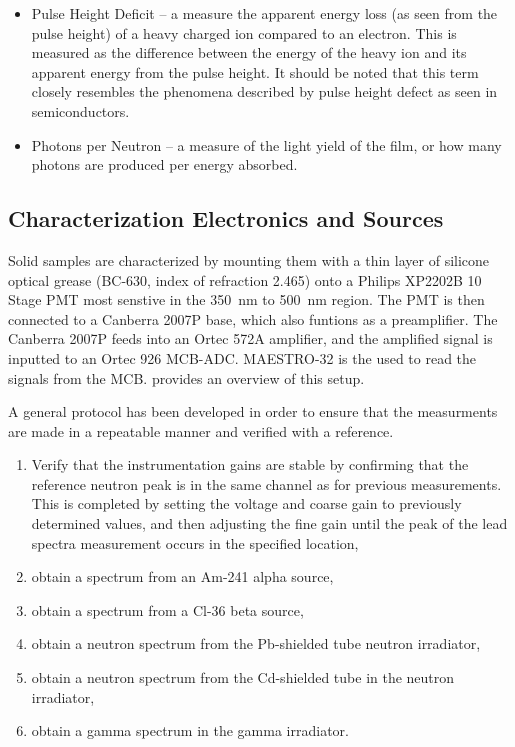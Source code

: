 \begin{itemize}
  \item  Pulse Height Deficit – a measure the apparent energy loss (as seen from the pulse height) of a heavy charged ion compared to an electron. This is measured as the difference between the energy of the heavy ion and its apparent energy from the pulse height. It should be noted that this term closely resembles the phenomena described by pulse height defect as seen in semiconductors.
  \item  Photons per Neutron – a measure of the light yield of the film, or how many photons are produced per energy absorbed.
\end{itemize}

\subsection{Characterization Electronics and Sources}
Solid samples are characterized by mounting them with a thin layer of silicone optical grease (BC-630, index of refraction 2.465) onto a Philips XP2202B 10 Stage PMT most senstive in the \SI{350}{\nm} to \SI{500}{\nm} region.
The PMT is then connected to a Canberra 2007P base, which also funtions as a preamplifier.
The Canberra 2007P feeds into an Ortec 572A amplifier, and the amplified signal is inputted to an Ortec 926 MCB-ADC.
MAESTRO-32 is the used to read the signals from the MCB.
 provides an overview of this setup.
\begin{figure}
  \label{fig:ElectronicSetup}
\end{figure}
A general protocol has been developed in order to ensure that the measurments are made in a repeatable manner and verified with a reference.
\begin{enumerate}
  \item Verify that the instrumentation gains are stable by confirming that the reference neutron peak is in the same channel as for previous measurements. This is completed by setting the voltage and coarse gain to previously determined values, and then adjusting the fine gain until the peak of the lead spectra measurement occurs in the specified location,
  \item obtain a spectrum from an Am-241 alpha source,
  \item obtain a spectrum from a Cl-36 beta source,
  \item obtain a neutron spectrum from the Pb-shielded tube neutron irradiator,
  \item obtain a neutron spectrum from the Cd-shielded tube in the neutron irradiator,
  \item obtain a gamma spectrum in the gamma irradiator.
\end{enumerate}

